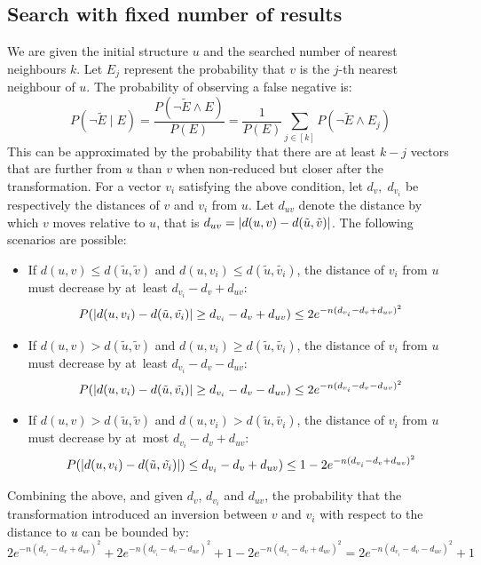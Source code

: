 \subsection{Search with fixed number of results}
We are given the initial structure \( u \) and the searched number of nearest neighbours \( k \). Let \( E_j \) represent the probability that \( v \) is the \( j \)-th nearest neighbour of \( u \). The probability of observing a false negative is:
\[
    P(\neg \tilde{E} \mid E) = \frac{P(\neg \tilde{E} \land E)}{P(E)} =  \frac{1}{P(E)} \sum_{j \in [k]} P(\neg \tilde{E} \land E_j)
\]
This can be approximated by the probability that there are at least \( k-j \) vectors that are further from \( u \) than \( v \) when non-reduced but closer after the transformation. For a vector \( v_i \) satisfying the above condition, let \( d_v,\; d_{v_i} \) be respectively the distances of \( v \) and \( v_i \) from \( u \). Let \( d_{uv} \) denote the distance by which \( v \) moves relative to \( u \), that is \( d_{uv} = \left| d(u, v) - d(\tilde{u}, \tilde{v}) \right| \). The following scenarios are possible:
\begin{itemize}
    \item If \( d(u, v) \leq d(\tilde{u}, \tilde{v}) \) and \( d(u, v_i) \leq d(\tilde{u}, \tilde{v_i}) \), the distance of \( v_i \) from \( u \) must decrease by at~least \( d_{v_i} - d_v + d_{uv} \):
    \[
        P(\left| d(u, v_i) - d(\tilde{u}, \tilde{v_i}) \right| \geq d_{v_i} - d_v + d_{uv}) \leq 2 e^{-n(d_{v_i} - d_v + d_{uv})^2}
    \]
    \item If \( d(u, v) > d(\tilde{u}, \tilde{v}) \) and \( d(u, v_i) \geq d(\tilde{u}, \tilde{v_i}) \), the distance of \( v_i \) from \( u \) must decrease by at~least \( d_{v_i} - d_v - d_{uv} \):
    \[
        P(\left| d(u, v_i) - d(\tilde{u}, \tilde{v_i}) \right| \geq d_{v_i} - d_v - d_{uv}) \leq 2 e^{-n(d_{v_i} - d_v - d_{uv})^2}
    \]
    \item If \( d(u, v) > d(\tilde{u}, \tilde{v}) \) and \( d(u, v_i) > d(\tilde{u}, \tilde{v_i}) \), the distance of \( v_i \) from \( u \) must decrease by at~most \( d_{v_i} - d_v + d_{uv} \):
    \[
       P(\left| d(u, v_i) - d(\tilde{u}, \tilde{v_i}) \right|) \leq d_{v_i} - d_v + d_{uv}) \leq 1 - 2 e^{-n(d_{v_i} - d_v + d_{uv})^2}
    \]
\end{itemize}
Combining the above, and given \( d_v \), \( d_{v_i} \) and \( d_{uv} \), the probability that the transformation introduced an inversion between \( v \) and \( v_i \) with respect to the distance to \( u \) can be bounded by:
\[
    2 e^{-n(d_{v_i} - d_v + d_{uv})^2} + 2 e^{-n(d_{v_i} - d_v - d_{uv})^2} + 1 - 2 e^{-n(d_{v_i} - d_v + d_{uv})^2} = 2 e^{-n(d_{v_i} - d_v - d_{uv})^2} + 1
\]
